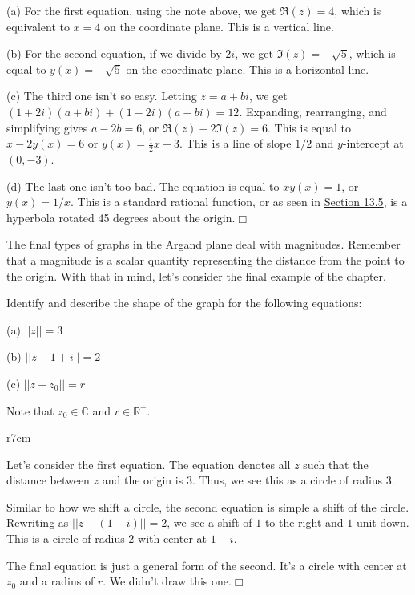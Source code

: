 \documentclass[lang=en,11pt]{elegantbook}
\begin{document}
\begin{solution}

(a) For the first equation, using the note above, we get $\Re(z)=4$, which is equivalent to $x=4$ on the coordinate plane.  This is a vertical line.

(b) For the second equation, if we divide by $2i$, we get $\Im(z)=-\sqrt{5}$, which is equal to $y(x)=-\sqrt{5}$ on the coordinate plane.  This is a horizontal line.

(c) The third one isn't so easy.  Letting $z=a+bi$, we get $(1+2i)(a+bi)+(1-2i)(a-bi)=12$.  Expanding, rearranging, and simplifying gives $a-2b=6$, or $\Re(z)-2\Im(z)=6$.  This is equal to $x-2y(x)=6$ or $\displaystyle y(x)=\frac{1}{2}x-3$.  This is a line of slope $1/2$ and $y$-intercept at $(0,-3)$.

(d) The last one isn't too bad.  The equation is equal to $xy(x)=1$, or $y(x)=1/x$.  This is a standard rational function, or as seen in \hyperlink{section.13.5}{Section 13.5}, is a hyperbola rotated 45 degrees about the origin.$\Box$
\end{solution}
\noindent The final types of graphs in the Argand plane deal with magnitudes.  Remember that a magnitude is a scalar quantity representing the distance from the point to the origin.  With that in mind, let's consider the final example of the chapter.
\newpage
\begin{example}
Identify and describe the shape of the graph for the following equations: 

(a) $||z||=3$

(b) $||z-1+i||=2$

(c) $||z-z_0||=r$

Note that $z_0\in\mathbb{C}$ and $r\in\mathbb{R}^+$.
\end{example}
\begin{wrapfigure}{r}{7cm}
    \centering
{}
\end{wrapfigure}
\begin{solution}
Let's consider the first equation.  The equation denotes all $z$ such that the distance between $z$ and the origin is $3$.  Thus, we see this as a circle of radius $3$.

Similar to how we shift a circle, the second equation is simple a shift of the circle.  Rewriting as $||z-(1-i)||=2$, we see a shift of $1$ to the right and $1$ unit down.  This is a circle of radius $2$ with center at $1-i$.

The final equation is just a general form of the second.  It's a circle with center at $z_0$ and a radius of $r$.  We didn't draw this one.$\Box$
\end{solution}
\end{document}
